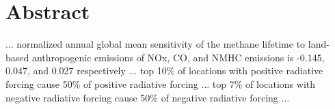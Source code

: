 \section*{Abstract}

... normalized annual global mean sensitivity of the methane lifetime to land-based anthropogenic emissions of NOx, CO, and NMHC emissions is -0.145, 0.047, and 0.027 respectively ... top 10\% of locations with positive radiative forcing cause 50\% of positive radiative forcing ... top 7\% of locations with negative radiative forcing cause 50\% of negative radiative forcing ... 